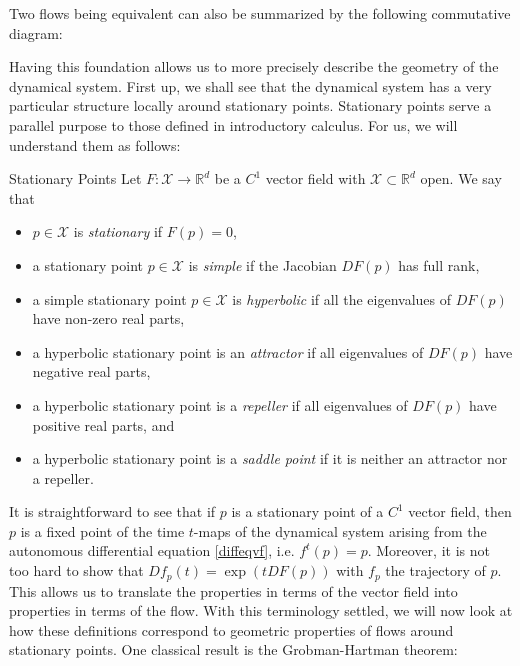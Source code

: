 \documentclass[11pt, a4paper]{memoir}
\theoremstyle{break}
\theoremstyle{break}
\theoremstyle{nonumberplain}
\newcommand{\mR}{\mathbb{R}}
\begin{document}
\noindent Two flows being equivalent can also be summarized by the following commutative diagram:
\begin{center}
\end{center}
Having this foundation allows us to more precisely describe the geometry of the dynamical system. First up, we shall see that the dynamical system has a very particular structure locally around stationary points. Stationary points serve a parallel purpose to those defined in introductory calculus. For us, we will understand them as follows:
\begin{mydefinition}{Stationary Points}
Let $F:\mathcal{X}\to \mR^d$ be a $C^1$ vector field with $\mathcal{X}\subset \mR^d$ open. We say that
\begin{itemize}
	\item $p\in \mathcal{X}$ is \emph{stationary} if $F(p)=0$,
	\item a stationary point $p\in \mathcal{X}$ is \emph{simple} if the Jacobian $DF(p)$ has full rank,
	\item a simple stationary point $p\in \mathcal{X}$ is \emph{hyperbolic} if all the eigenvalues of $DF(p)$ have non-zero real parts,
	\item a hyperbolic stationary point is an \emph{attractor} if all eigenvalues of $DF(p)$ have negative real parts,
	\item a hyperbolic stationary point is a \emph{repeller} if all eigenvalues of $DF(p)$ have positive real parts, and
	\item a hyperbolic stationary point is a \emph{saddle point} if it is neither an attractor nor a repeller.	
\end{itemize}
\end{mydefinition}
It is straightforward to see that if $p$ is a stationary point of a $C^1$ vector field, then $p$ is a fixed point of the time $t$-maps of the dynamical system arising from the autonomous differential equation \ref{diffeqvf}, i.e. $f^t(p)=p$. Moreover, it is not too hard to show that $Df_p(t)=\exp(tDF(p))$ with $f_p$ the trajectory of $p$. This allows us to translate the properties in terms of the vector field into properties in terms of the flow. With this terminology settled, we will now look at how these definitions correspond to geometric properties of flows around stationary points. One classical result is the Grobman-Hartman theorem:
\end{document}
